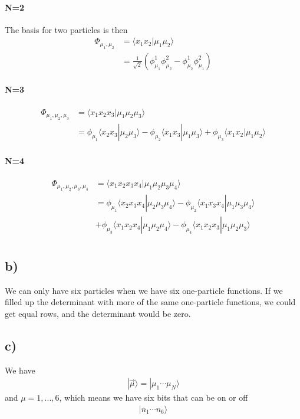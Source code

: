 \documentclass[norsk, 12pt]{article}
\newcommand{\la}{\langle}
\newcommand{\ra}{\rangle}
\begin{document}
\paragraph{N=2}
\label{par:1}
The basis for two particles is then
\begin{align*}
	\Phi_{\mu_1,\mu_2} &= \la x_1 x_2 | \mu_1 \mu _2 \ra\\
    &=\frac{1}{\sqrt{2}}\left(\phi_{\mu_1}^1 \phi_{\mu_2}^2 - \phi_{\mu_2}^1 \phi_{\mu_1}^2 \right)
\end{align*}

\paragraph{N=3}
\label{par:2}
\begin{align*}
	\Phi_{\mu_1,\mu_2,\mu_3} &= \la x_1 x_2 x_3 | \mu_1 \mu _2 \mu_3 \ra\\
    &=\phi_{\mu_1}\la x_2 x_3 | \mu _2 \mu_3 \ra - \phi_{\mu_2}\la x_1 x_3 | \mu _1 \mu_3 \ra + \phi_{\mu_3}\la x_1 x_2 | \mu _1 \mu_2 \ra
\end{align*}

\paragraph{N=4}
\label{par:3}
\begin{align*}
	\Phi_{\mu_1,\mu_2,\mu_3,\mu_4} &= \la x_1 x_2 x_3 x_4 | \mu_1 \mu _2 \mu_3 \mu_4 \ra\\
    &=\phi_{\mu_1}\la x_2 x_3 x_4 | \mu _2 \mu_3 \mu_4 \ra 
    - \phi_{\mu_2}\la x_1 x_3 x_4 | \mu _1 \mu_3 \mu_4 \ra\\&
    + \phi_{\mu_3}\la x_1 x_2 x_4 | \mu _1 \mu_2 \mu_4 \ra
    -  \phi_{\mu_4}\la x_1 x_2 x_3 | \mu _1 \mu_2 \mu_3 \ra\\
\end{align*}

\subsection*{b)}
\label{sub:1.13b}

We can only have six particles when we have six one-particle functions. 
If we filled up the determinant with more of the same one-particle functions, we
could get equal rows, and the determinant would be zero.

\subsection*{c)}
\label{sub:1.13c}
We have
\begin{align*}
	|\vec\mu\ra = |\mu_1\cdots \mu_N\ra
\end{align*}
and $\mu = 1,...,6$, which means we have six bits that can be on or off
\begin{align*}
	|n_1\cdots n_6\ra
\end{align*}
\end{document}
